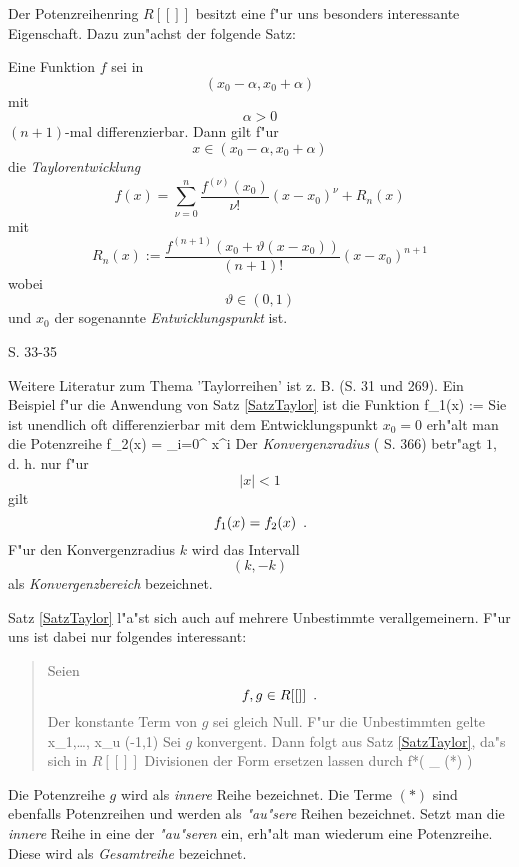 \sloppy
Der Potenzreihenring $R[[]]$ besitzt eine f"ur uns besonders interessante
Eigenschaft. Dazu zu\-n"achst der folgende Satz: \fussy
\begin{satz}[Taylor]
\label{SatzTaylor}
    Eine Funktion $f$ sei in \[ (x_0-\alpha,x_0+\alpha) \] mit
    \[ \alpha > 0 \] $(n+1)$-mal differenzierbar. Dann gilt f"ur
    \[ x \in (x_0-\alpha,x_0+\alpha) \] die {\em Taylorentwicklung}
    \[
        f(x)= \sum_{\nu = 0}^n \frac{ f^{(\nu)}(x_0) }{ \nu! }
                  (x-x_0)^{\nu} + R_n(x)
    \]
    mit
    \[
        R_n(x):= \frac{ f^{(n+1)}(x_0+ \vartheta(x-x_0)) }{ (n+1)! }
                 (x-x_0)^{n+1}
    \]
    wobei \[ \vartheta \in (0,1) \] und $x_0$ der sogenannte
    {\em Entwicklungspunkt} ist.
\end{satz}
\begin{beweis}
    \cite{Hild74} S. 33-35
\end{beweis}
Weitere Literatur zum Thema 'Taylorreihen' ist z. B. \cite{BS87} (S. 31 und
269). Ein Beispiel f"ur die Anwendung von Satz \ref{SatzTaylor} ist die
Funktion
    f_1(x) :=  \MyPunkt
\Eeq
Sie ist unendlich oft
differenzierbar mit dem Entwicklungspunkt $x_0=0$ erh"alt man die
Potenzreihe
    f_2(x) = \sum_{i=0}^{\infty} x^i \MyPunkt
\Eeq
Der {\em Konvergenzradius}  (\cite{BS87} S. 366)
betr"agt $1$, d. h. nur f"ur
\[ |x| < 1 \] gilt \[ f_1(x)=f_2(x) \mbox{\hspace{0.5em}.} \]
F"ur den Konvergenzradius $k$ wird das Intervall 
\[ (k,-k) \] als {\em Konvergenzbereich}  
bezeichnet.

Satz \ref{SatzTaylor} l"a"st sich auch auf mehrere Unbestimmte
verallgemeinern. F"ur uns ist dabei nur folgendes interessant:
\begin{quote}
     Seien \[ f,g \in R[[]] \mbox{\hspace{0.5em}.} \]
     Der konstante Term von $g$ sei gleich Null.
     F"ur die Unbestimmten gelte 
         x_1,\ldots, x_u \in (-1,1) \MyPunkt
     \Eeq
     Sei $g$ konvergent.
     Dann folgt aus Satz \ref{SatzTaylor}, da"s sich
     in $R[[]]$ Divisionen der Form
     \Eeq
     ersetzen lassen durch
        f*(
              _{ (*) }
          ) \MyPunkt
     \Eeq
\end{quote}
Die Potenzreihe $g$ wird als {\em innere} Reihe bezeichnet.
Die Terme $(*)$
sind ebenfalls Potenzreihen und werden als
{\em "au"sere} Reihen bezeichnet. Setzt man die {\em innere} Reihe in eine
der {\em "au"seren} ein, erh"alt man wiederum eine Potenzreihe. Diese wird
als {\em Gesamtreihe} bezeichnet.

